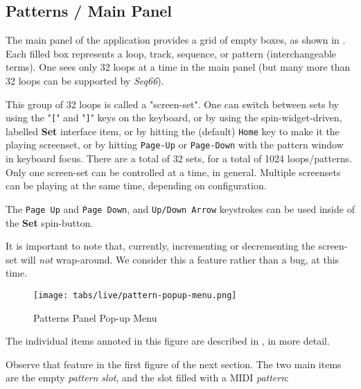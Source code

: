 \subsection{Patterns / Main Panel}
\label{subsec:patterns_panel_main}

   The main panel of the application provides a grid of empty boxes,
   as shown in
   .
   Each filled box represents a loop, track, sequence, or pattern
   (interchangeable terms).
   One sees only 32 loops at a time in the main panel (but many more than
   32 loops can be supported by \textsl{Seq66}).

   This group of 32 loops is called a "screen-set".
   One can switch between sets by using the
   \index{keys![}
   "\texttt{[}" and
   \index{keys!]}
   "\texttt{]}" keys on the keyboard, or by using
   the spin-widget-driven, labelled \textbf{Set} interface item, or
   by hitting the (default) \texttt{Home} key to make it the playing screenset,
   or by hitting \texttt{Page-Up} or \texttt{Page-Down} with the pattern window
   in keyboard focus.
   There are a total of 32 sets, for a total of 1024 loops/patterns. 
   Only one screen-set can be controlled at a time, in general.
   Multiple screensets can be playing at the same time, depending on
   configuration.

   The \texttt{Page Up} and \texttt{Page Down}, and \texttt{Up/Down Arrow}
   keystrokes can be used inside of the \textbf{Set} spin-button.

   It is important to note that, currently, incrementing or decrementing
   the screen-set will \textsl{not} wrap-around.
   We consider this a feature rather than a bug, at this time.

\begin{figure}[H]
   \centering 
   \texttt{[image: tabs/live/pattern-popup-menu.png]}
   \caption{Patterns Panel Pop-up Menu}
   \label{fig:patterns_panel_popup_menu}
\end{figure}

   The individual items annoted in this figure are described in
   , in more detail.

   Observe that feature in the first figure of the next section.
   The two main items are the empty \textsl{pattern slot}, and the slot filled
   with a MIDI \textsl{pattern}:

